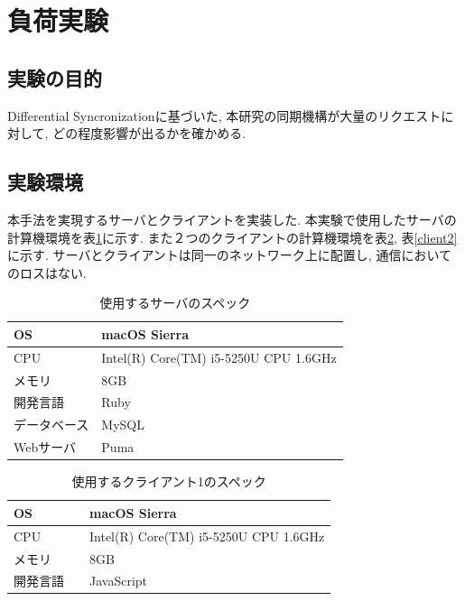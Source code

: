\section{負荷実験}
\subsection{実験の目的}
Differential Syncronizationに基づいた, 本研究の同期機構が大量のリクエストに対して, どの程度影響が出るかを確かめる.
\subsection{実験環境}
本手法を実現するサーバとクライアントを実装した. 本実験で使用したサーバの計算機環境を表\ref{server}に示す. また２つのクライアントの計算機環境を表\ref{client1}, 表\ref{client2}に示す. サーバとクライアントは同一のネットワーク上に配置し, 通信においてのロスはない.
\begin{table}[]
\begin{center}
	\caption{使用するサーバのスペック}
	\begin{tabular}{|l|l|} \hline
		OS &  macOS Sierra　\\ \hline
		CPU & Intel(R) Core(TM) i5-5250U CPU 1.6GHz \\ \hline
		メモリ & 8GB \\ \hline
    開発言語　& Ruby \\ \hline
		データベース & MySQL \\ \hline
		Webサーバ & Puma\\ \hline
	\end{tabular}
	\label{server}
\end{center}
\end{table}

\begin{table}[]
\begin{center}
	\caption{使用するクライアント1のスペック}
	\begin{tabular}{|l|l|} \hline
		OS & macOS Sierra \\ \hline
		CPU & Intel(R) Core(TM) i5-5250U CPU 1.6GHz \\ \hline
		メモリ & 8GB \\ \hline
    開発言語　& JavaScript \\ \hline
	\end{tabular}
	\label{client1}
\end{center}
\end{table}

